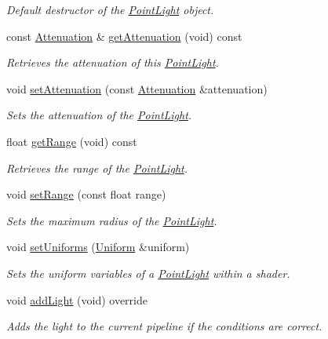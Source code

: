 \begin{DoxyCompactItemize}
\begin{DoxyCompactList}\small\item\em Default destructor of the \hyperlink{classsparky_1_1_point_light}{Point\+Light} object. \end{DoxyCompactList}\item 
const \hyperlink{structsparky_1_1_attenuation}{Attenuation} \& \hyperlink{classsparky_1_1_point_light_ad7c189e15b39edc5ebb4de54a156e435}{get\+Attenuation} (void) const 
\begin{DoxyCompactList}\small\item\em Retrieves the attenuation of this \hyperlink{classsparky_1_1_point_light}{Point\+Light}. \end{DoxyCompactList}\item 
void \hyperlink{classsparky_1_1_point_light_aa03adb581601b178ff0058ad18af1ec9}{set\+Attenuation} (const \hyperlink{structsparky_1_1_attenuation}{Attenuation} \&attenuation)
\begin{DoxyCompactList}\small\item\em Sets the attenuation of the \hyperlink{classsparky_1_1_point_light}{Point\+Light}. \end{DoxyCompactList}\item 
float \hyperlink{classsparky_1_1_point_light_aaf453df6857c6dfc6e50c08adaf40184}{get\+Range} (void) const 
\begin{DoxyCompactList}\small\item\em Retrieves the range of the \hyperlink{classsparky_1_1_point_light}{Point\+Light}. \end{DoxyCompactList}\item 
void \hyperlink{classsparky_1_1_point_light_ab82fe8464f26b87ab595a2a9bfc14281}{set\+Range} (const float range)
\begin{DoxyCompactList}\small\item\em Sets the maximum radius of the \hyperlink{classsparky_1_1_point_light}{Point\+Light}. \end{DoxyCompactList}\item 
void \hyperlink{classsparky_1_1_point_light_a09d074c94750d1bf892eaf2e757d1aec}{set\+Uniforms} (\hyperlink{classsparky_1_1_uniform}{Uniform} \&uniform)
\begin{DoxyCompactList}\small\item\em Sets the uniform variables of a \hyperlink{classsparky_1_1_point_light}{Point\+Light} within a shader. \end{DoxyCompactList}\item 
void \hyperlink{classsparky_1_1_point_light_a12ff1a240f2ad0e91a12e57e1c6ed7e7}{add\+Light} (void) override
\begin{DoxyCompactList}\small\item\em Adds the light to the current pipeline if the conditions are correct. \end{DoxyCompactList}\end{DoxyCompactItemize}
